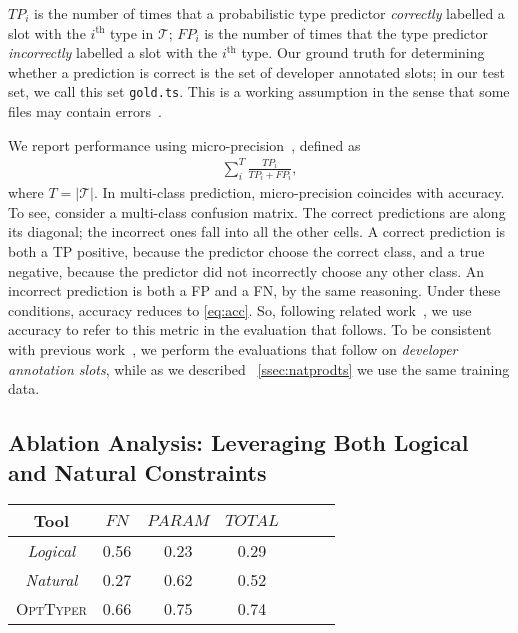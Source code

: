 \documentclass[acmsmall, review, anonymous]{acmart}\settopmatter{printfolios=true,printccs=false,printacmref=false}
\newcommand{\projectname}{\textsc{OptTyper}\xspace}
\begin{document}
$\mathit{TP_i}$ is the number of times that a probabilistic type predictor \emph{correctly} labelled a slot with the $i^\text{th}$ type in $\mathcal{T}$;  $\mathit{FP_i}$ is the number of times that the type predictor \emph{incorrectly} labelled a slot with the $i^\text{th}$ type.  Our ground truth for determining whether a prediction is correct is the set of developer annotated slots; in our test set, we call this set \texttt{gold.ts}. 
This is a working assumption in the sense that some files may contain errors~\citet{williams17}.

We report performance using micro-precision~\cite{manning}, defined as 
%
\begin{align}\label{eq:acc}
    \sum_i^T \frac{\mathit{TP_i}}{\mathit{TP_i} + \mathit{FP_i}},
\end{align}
%
where $T=|\mathcal{T}|$. In multi-class prediction, micro-precision coincides with accuracy.  To see, consider a multi-class confusion matrix.  The correct predictions are along its diagonal; the incorrect ones fall into all the other cells.  A correct prediction is both a TP positive, because the predictor choose the correct class, and a true negative, because the predictor did not incorrectly choose any other class.  An incorrect prediction is both a FP and a FN, by the same reasoning.  Under these conditions, accuracy reduces to \autoref{eq:acc}.
So, following related work~\cite{wei20}, we use accuracy to refer to this metric in the evaluation that follows.  To be consistent with previous work~\citep{hellendoorn18,wei20}, we perform the evaluations that follow on \textit{developer annotation slots}, while as we described
~\cref{ssec:natprodts} we use the same training data.


\subsection{Ablation Analysis:  Leveraging Both Logical and Natural Constraints}

\begin{table*}[t]
	\centering
	\caption{Ablation analysis of \projectname, the cells report accuracy; FN refers to return types of functions and PARAM
	represents parameters.}
\label{tab:typeacc1}
	\begin{tabular}{ccccccc}
		\toprule
		Tool  & $\textit{FN}$ & 
		$\textit{PARAM}$ & $\textit{TOTAL}$ \\
		
		\midrule
		\textit{Logical}      & 0.56                                   & 0.23                                 & 0.29                                  \\
		\textit{Natural}      & 0.27                                    & 0.62                                 & 0.52                                   \\
		\projectname  & 0.66         & 0.75         & 0.74\\
		\bottomrule
	\end{tabular}
\end{table*}
\end{document}
